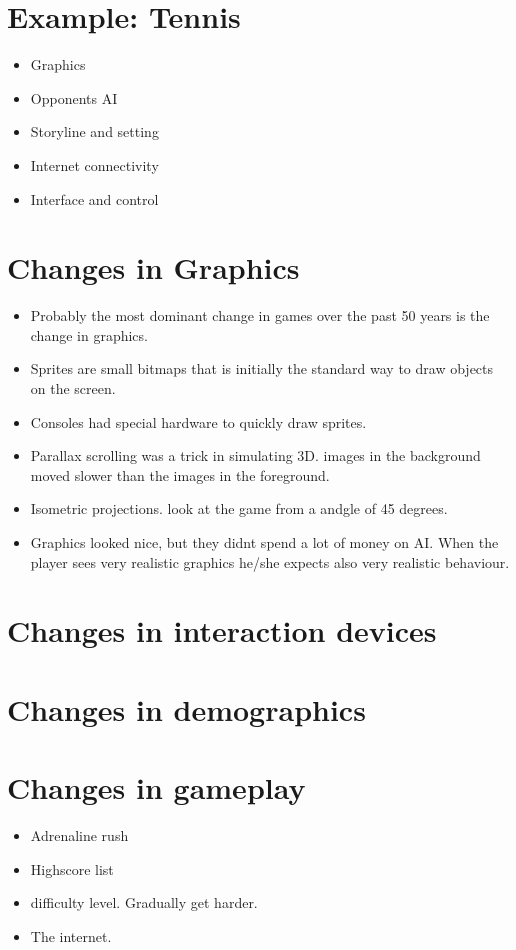   \section*{Example: Tennis}

    \begin{itemize}
      \item Graphics
      \item Opponents AI
      \item Storyline and setting
      \item Internet connectivity
      \item Interface and control
    \end{itemize}

  \section*{Changes in Graphics}
    \begin{itemize}
      \item Probably the most dominant change in games over the past 50 years is the change in graphics. 
      \item Sprites are small bitmaps that is initially the standard way to draw objects on the screen.
      \item Consoles had special hardware to quickly draw sprites. 
      \item Parallax scrolling was a trick in simulating 3D. images in the background moved slower than the images in the foreground. 
      \item Isometric projections. look at the game from a andgle of 45 degrees. 
      \item Graphics looked nice, but they didnt spend a lot of money on AI. When the player sees very realistic graphics he/she expects also very realistic behaviour. 
    \end{itemize}

  \section*{Changes in interaction devices}

  \section{Changes in demographics}

  \section*{Changes in gameplay}
    \begin{itemize}
      \item Adrenaline rush
      \item Highscore list
      \item difficulty level. Gradually get harder.
      \item The internet. 
    \end{itemize}

